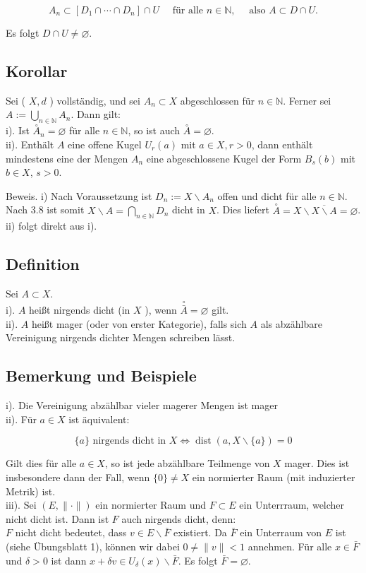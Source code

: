 \documentclass[10pt, letterpaper]{article}
\begin{document}
$$
A_{n} \subset\left[D_{1} \cap \cdots \cap D_{n}\right] \cap U \quad \text { für alle } n \in \mathbb{N}, \quad \text { also } A \subset D \cap U .
$$

Es folgt $D \cap U \neq \varnothing$.

\subsection*{Korollar}
Sei ( $X, d$ ) vollständig, und sei $A_{n} \subset X$ abgeschlossen für $n \in \mathbb{N}$. Ferner sei $A:= \bigcup_{n \in \mathbb{N}} A_{n}$. Dann gilt:\\
i). Ist $\stackrel{\circ}{A}_{n}=\varnothing$ für alle $n \in \mathbb{N}$, so ist auch $\stackrel{\circ}{A}=\varnothing$.\\
ii). Enthält $A$ eine offene Kugel $U_{r}(a)$ mit $a \in X, r>0$, dann enthält mindestens eine der Mengen $A_{n}$ eine abgeschlossene Kugel der Form $B_{s}(b)$ mit $b \in X$, $s>0$.

Beweis. i) Nach Voraussetzung ist $D_{n}:=X \backslash A_{n}$ offen und dicht für alle $n \in \mathbb{N}$. Nach 3.8 ist somit $X \backslash A=\bigcap_{n \in \mathbb{N}} D_{n}$ dicht in $X$. Dies liefert $\stackrel{\circ}{A}=X \backslash \overline{X \backslash A}=\varnothing$. ii) folgt direkt aus i).

\subsection*{Definition}
Sei $A \subset X$.\\
i). $A$ heißt nirgends dicht (in $X$ ), wenn $\stackrel{\circ}{\bar{A}}=\varnothing$ gilt.\\
ii). $A$ heißt mager (oder von erster Kategorie), falls sich $A$ als abzählbare Vereinigung nirgends dichter Mengen schreiben lässt.

\subsection*{Bemerkung und Beispiele}
i). Die Vereinigung abzählbar vieler magerer Mengen ist mager\\
ii). Für $a \in X$ ist äquivalent:

$$
\{a\} \text { nirgends dicht in } X \Longleftrightarrow \operatorname{dist}(a, X \backslash\{a\})=0
$$

Gilt dies für alle $a \in X$, so ist jede abzählbare Teilmenge von $X$ mager. Dies ist insbesondere dann der Fall, wenn $\{0\} \neq X$ ein normierter Raum (mit induzierter Metrik) ist.\\
iii). Sei $(E,\|\cdot\|)$ ein normierter Raum und $F \subset E$ ein Unterrraum, welcher nicht dicht ist. Dann ist $F$ auch nirgends dicht, denn:\\
$F$ nicht dicht bedeutet, dass $v \in E \backslash \bar{F}$ existiert. Da $\bar{F}$ ein Unterraum von $E$ ist (siehe Übungsblatt 1), können wir dabei $0 \neq\|v\|<1$ annehmen. Für alle $x \in \bar{F}$ und $\delta>0$ ist dann $x+\delta v \in U_{\delta}(x) \backslash \bar{F}$. Es folgt $\bar{F}=\varnothing$.
\end{document}
